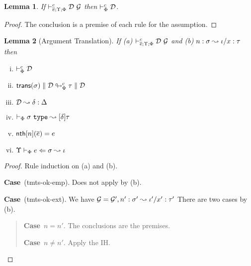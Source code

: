 \documentclass[12pt]{article}
\newtheorem{lemma}{Lemma}
\newcommand{\pfcase}[1]{\textbf{Case}~#1. }
\begin{document}
\begin{lemma}
\label{lemma:get-D}
If $\vdash_{\overline{e}; \Upsilon; \Phi}^{c} \mathcal{D}~\mathcal{G}$ then $\vdash_{\Phi}^{c} \mathcal{D}$.
\end{lemma}
\begin{proof}
    The conclusion is a premise of each rule for the assumption.
\end{proof}

\begin{lemma}[Argument Translation]
\label{lemma:argument-translation}
If (a) $\vdash_{\overline{e}; \Upsilon; \Phi}^{c} \mathcal{D}~\mathcal{G}$ and (b) $n : \sigma \leadsto \iota/x : \tau$ then \begin{enumerate}[(i)]
\item $\vdash_{\Phi}^{c} \mathcal{D}$
\item ${\sf trans}(\sigma) \parallel \mathcal{D} \looparrowright_{\Phi}^{c} \tau \parallel \mathcal{D}$
\item $\mathcal{D} \leadsto \delta : \Delta$
\item $\vdash_{\Phi} \sigma~\mathtt{type} \leadsto [\delta]\tau$
\item ${\sf nth}[n](\overline{e})=e$
\item $\Upsilon \vdash_{\Phi} e \Leftarrow \sigma \leadsto \iota$
\end{enumerate}
\end{lemma}
\begin{proof} Rule induction on (a) and (b).

\pfcase{(tmts-ok-emp)} Does not apply by (b).

\pfcase{(tmts-ok-ext)} We have $\mathcal{G}=\mathcal{G}', n' : \sigma' \leadsto \iota'/x' :\tau'$ There are two cases by (b).
\begin{quote}
    \pfcase{$n=n'$} The conclusions are the premises.

    \pfcase{$n\neq n'$} Apply the IH.
\end{quote}
\end{proof}
\end{document}
